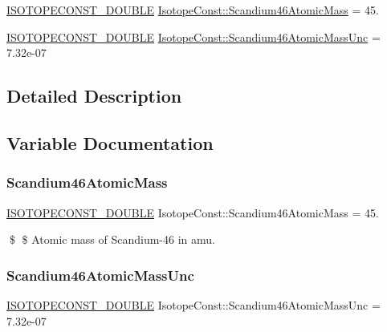 \begin{DoxyCompactItemize}
\item 
\mbox{\hyperlink{group___isotope_const-_macros_ga8f45a7272ce02c0b4c65c44636ed719a}{I\+S\+O\+T\+O\+P\+E\+C\+O\+N\+S\+T\+\_\+\+D\+O\+U\+B\+LE}} \mbox{\hyperlink{group___isotope_const-_scandium-_sc46_ga1663d4ca29cb4455000a67fcc888635a}{Isotope\+Const\+::\+Scandium46\+Atomic\+Mass}} = 45.
\item 
\mbox{\hyperlink{group___isotope_const-_macros_ga8f45a7272ce02c0b4c65c44636ed719a}{I\+S\+O\+T\+O\+P\+E\+C\+O\+N\+S\+T\+\_\+\+D\+O\+U\+B\+LE}} \mbox{\hyperlink{group___isotope_const-_scandium-_sc46_ga124552d93e85f7aa8163868de73f1cdd}{Isotope\+Const\+::\+Scandium46\+Atomic\+Mass\+Unc}} = 7.\+32e-\/07
\end{DoxyCompactItemize}


\subsection{Detailed Description}


\subsection{Variable Documentation}
\mbox{\label{group___isotope_const-_scandium-_sc46_ga1663d4ca29cb4455000a67fcc888635a}} 
\subsubsection{\texorpdfstring{Scandium46\+Atomic\+Mass}{Scandium46AtomicMass}}
{\footnotesize\ttfamily \mbox{\hyperlink{group___isotope_const-_macros_ga8f45a7272ce02c0b4c65c44636ed719a}{I\+S\+O\+T\+O\+P\+E\+C\+O\+N\+S\+T\+\_\+\+D\+O\+U\+B\+LE}} Isotope\+Const\+::\+Scandium46\+Atomic\+Mass = 45.}

\$ \$ Atomic mass of Scandium-\/46 in amu. \mbox{\label{group___isotope_const-_scandium-_sc46_ga124552d93e85f7aa8163868de73f1cdd}} 
\subsubsection{\texorpdfstring{Scandium46\+Atomic\+Mass\+Unc}{Scandium46AtomicMassUnc}}
{\footnotesize\ttfamily \mbox{\hyperlink{group___isotope_const-_macros_ga8f45a7272ce02c0b4c65c44636ed719a}{I\+S\+O\+T\+O\+P\+E\+C\+O\+N\+S\+T\+\_\+\+D\+O\+U\+B\+LE}} Isotope\+Const\+::\+Scandium46\+Atomic\+Mass\+Unc = 7.\+32e-\/07}

